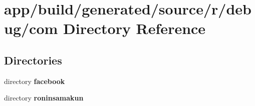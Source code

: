 \section{app/build/generated/source/r/debug/com Directory Reference}
\label{dir_468e947fae7762cfe61e1baa33f145bf}
\subsection*{Directories}
\begin{DoxyCompactItemize}
\item 
directory {\bf facebook}
\item 
directory {\bf roninsamakun}
\end{DoxyCompactItemize}
